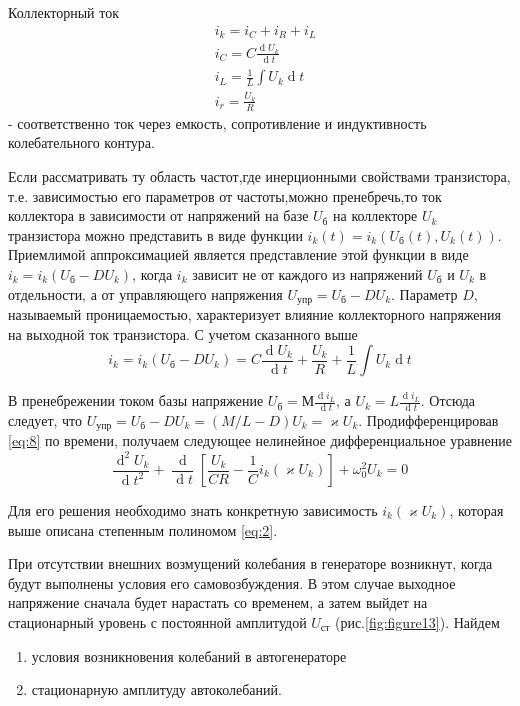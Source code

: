 Коллекторный ток
\begin{equation*}
\begin{aligned}
&i_k=i_C+i_R+i_L \\
&i_C=C\frac{\operatorname dU_k}{\operatorname dt} \\
&i_L=\frac{1}{L}\int U_k \operatorname dt \\
&i_r=\frac{U_k}{R}
\end{aligned}
\end{equation*}
- соответственно ток через емкость, сопротивление и индуктивность колебательного контура.

Если рассматривать ту область частот,где инерционными свойствами транзистора, т.е. зависимостью его параметров от частоты,можно пренебречь,то ток коллектора в зависимости от напряжений на базе $U_\text{б}$ на коллекторе $U_k$ транзистора можно представить в виде функции $i_k(t)=i_k(U_\text{б}(t),U_k(t))$. Приемлимой аппроксимацией является представление этой функции в виде $i_k=i_k(U_\text{б}-DU_k)$, когда $i_k$ зависит не от каждого из напряжений $U_\text{б}$ и $U_k$ в отдельности, а от управляющего напряжения $U_\text{упр}=U_\text{б}-DU_k$. Параметр $D$, называемый проницаемостью, характеризует влияние коллекторного напряжения на выходной ток транзистора. С учетом сказанного выше
\begin{equation}
i_k=i_k(U_\text{б}-DU_k)=C\frac{\operatorname dU_k}{\operatorname dt}+\frac{U_k}{R}+\frac{1}{L}\int U_k \operatorname dt
\label{eq:8}
\end{equation}{}

В пренебрежении током базы напряжение $\displaystyle U_\text{б}=М\frac{\operatorname di_L}{\operatorname dt}$, а $\displaystyle U_k=L\frac{\operatorname di_L}{\operatorname dt}$. Отсюда следует, что $U_\text{упр}=U_\text{б}-DU_k=(M/L-D)U_k=\varkappa U_k$. Продифференцировав \eqref{eq:8} по времени, получаем следующее нелинейное дифференциальное уравнение
\begin{equation}
\frac{\operatorname d^2U_k}{\operatorname dt^2}+\frac{\operatorname d}{\operatorname dt}[\frac{U_k}{CR}-\frac{1}{C}i_k(\varkappa U_k)]+\omega_0^2U_k=0
\label{eq:9}
\end{equation}

Для его решения необходимо знать конкретную зависимость $i_k(\varkappa U_k)$, которая выше описана степенным полиномом \eqref{eq:2}. 

При отсутствии внешних возмущений колебания в генераторе возникнут, когда будут выполнены условия его самовозбуждения. В этом случае выходное напряжение сначала будет нарастать со временем, а
затем выйдет на стационарный уровень с постоянной амплитудой $U_\text{ст}$ (рис.\ref{fig:figure13}). Найдем
\begin{enumerate}
\item условия возникновения колебаний в автогенераторе
\item стационарную амплитуду автоколебаний.
\end{enumerate}

